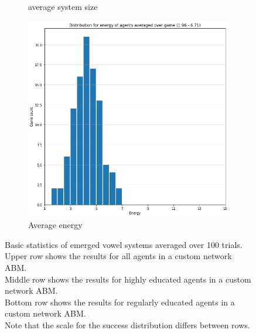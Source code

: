 \begin{figure}[ht]
\begin{subfigure}{.30\textwidth}
        \captionsetup{width=0.9\linewidth}
        \captionsetup{justification=centering}
        \caption{average system size}
    \end{subfigure}
    \hspace{0.5cm}
    \begin{subfigure}{.30\textwidth}
        \centering
        \includegraphics[width=\textwidth]{images/results/regular_energy.png}
        \captionsetup{width=0.9\linewidth}
        \captionsetup{justification=centering}
        \caption{Average energy}
    \end{subfigure}
    \captionsetup{width=\linewidth}
    \captionsetup{justification=centering}
    \caption{Basic statistics of emerged vowel systems averaged over 100 trials.
    \\Upper row shows the results for all agents in a custom network ABM.
    \\Middle row shows the results for highly educated agents in a custom network ABM.
    \\Bottom row shows the results for regularly educated agents in a custom network ABM.
    \\Note that the scale for the success distribution differs between rows.}
    \label{fig:general_community}
\end{figure}





